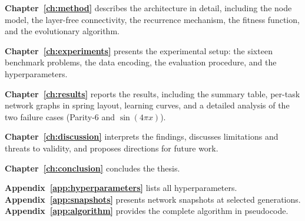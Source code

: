 \textbf{Chapter~\ref{ch:method}} describes the \modnet{} architecture in
detail, including the node model, the layer-free connectivity, the
recurrence mechanism, the fitness function, and the evolutionary
algorithm.

\textbf{Chapter~\ref{ch:experiments}} presents the experimental setup:
the sixteen benchmark problems, the data encoding, the evaluation
procedure, and the hyperparameters.

\textbf{Chapter~\ref{ch:results}} reports the results, including the
summary table, per-task network graphs in spring layout, learning curves,
and a detailed analysis of the two failure cases (Parity-6 and
$\sin(4\pi x)$).

\textbf{Chapter~\ref{ch:discussion}} interprets the findings, discusses
limitations and threats to validity, and proposes directions for future
work.

\textbf{Chapter~\ref{ch:conclusion}} concludes the thesis.

\textbf{Appendix~\ref{app:hyperparameters}} lists all hyperparameters.
\textbf{Appendix~\ref{app:snapshots}} presents network snapshots at
selected generations. \textbf{Appendix~\ref{app:algorithm}} provides the
complete algorithm in pseudocode.

